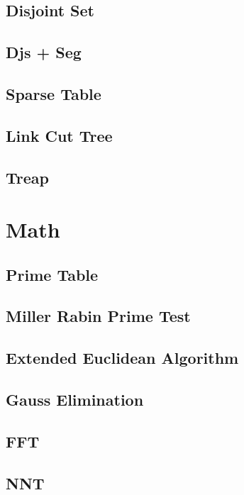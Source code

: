 \documentclass[10pt,twocolumn,oneside]{article}
\begin{document}
\subsection{Disjoint Set}

\subsection{Djs + Seg}

\subsection{Sparse Table}

\subsection{Link Cut Tree}

\subsection{Treap}


\section{Math}
\subsection{Prime Table}

\subsection{Miller Rabin Prime Test}

\subsection{Extended Euclidean Algorithm}

\subsection{Gauss Elimination}

\subsection{FFT}


\subsection{NNT}


\end{document}
